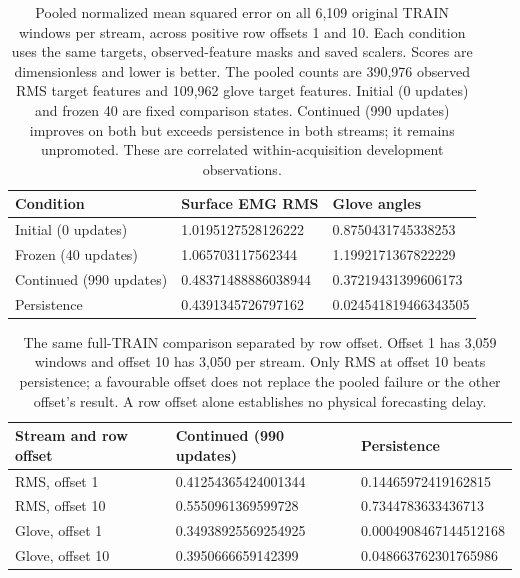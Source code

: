\begin{table}[htbp]
\centering
\setlength{\tabcolsep}{3pt}
\begin{tabular}{p{.29\linewidth}p{.32\linewidth}p{.32\linewidth}}
Condition & Surface EMG RMS & Glove angles\\\hline
Initial (0 updates) & 1.0195127528126222 & 0.8750431745338253\\
Frozen (40 updates) & 1.065703117562344 & 1.1992171367822229\\
Continued (990 updates) & 0.48371488886038944 & 0.37219431399606173\\
Persistence & 0.4391345726797162 & 0.024541819466343505\\
\hline
\end{tabular}
\caption{Pooled normalized mean squared error on all 6,109 original TRAIN windows per stream, across positive row offsets 1 and 10. Each condition uses the same targets, observed-feature masks and saved scalers. Scores are dimensionless and lower is better. The pooled counts are 390,976 observed RMS target features and 109,962 glove target features. Initial (0 updates) and frozen 40 are fixed comparison states. Continued (990 updates) improves on both but exceeds persistence in both streams; it remains unpromoted. These are correlated within-acquisition development observations.\cite{movementTrain990Recorded2026}}
\label{tab:self-forecast-pooled}
\end{table}

\begin{table}[htbp]
\centering
\setlength{\tabcolsep}{3pt}
\begin{tabular}{p{.29\linewidth}p{.32\linewidth}p{.32\linewidth}}
Stream and row offset & Continued (990 updates) & Persistence\\\hline
RMS, offset 1 & 0.41254365424001344 & 0.14465972419162815\\
RMS, offset 10 & 0.5550961369599728 & 0.7344783633436713\\
Glove, offset 1 & 0.34938925569254925 & 0.0004908467144512168\\
Glove, offset 10 & 0.3950666659142399 & 0.048663762301765986\\
\hline
\end{tabular}
\caption{The same full-TRAIN comparison separated by row offset. Offset 1 has 3,059 windows and offset 10 has 3,050 per stream. Only RMS at offset 10 beats persistence; a favourable offset does not replace the pooled failure or the other offset's result. A row offset alone establishes no physical forecasting delay.\cite{movementTrain990Recorded2026}}
\label{tab:self-forecast-offsets}
\end{table}

